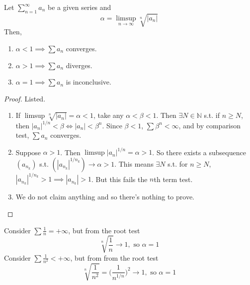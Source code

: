   \begin{theorem}
    Let $\sum_{n=1}^\infty a_n$ be a given series and 
    \begin{equation}
      \alpha = \limsup_{n\rightarrow \infty} \sqrt[n]{|a_n|}
    \end{equation}
    Then, 
    \begin{enumerate}
      \item $\alpha < 1 \implies \sum a_n$ converges. 
      \item $\alpha > 1 \implies \sum a_n$ diverges. 
      \item $\alpha = 1 \implies \sum a_n$ is inconclusive. 
    \end{enumerate}
  \end{theorem} 
  \begin{proof}
    Listed. 
    \begin{enumerate}
      \item If $\limsup \sqrt[n]{|a_n|} = \alpha < 1$, take any $\alpha < \beta < 1$. Then $\exists N \in \mathbb{N}$ s.t. if $n \geq N$, then $|a_n|^{1/n} < \beta \iff |a_n| < \beta^n$. Since $\beta < 1$, $\sum \beta^n < \infty$, and by comparison test, $\sum a_n$ converges. 

      \item Suppose $\alpha > 1$. Then $\limsup |a_n|^{1/n} = \alpha > 1$. So there exists a subsequence $(a_{n_k})$ s.t. $(|a_{n_k}|^{1/n_k}) \rightarrow \alpha > 1$. This means $\exists N$ s.t. for $n \geq N$, $|a_{n_k}|^{1/{n_k}} > 1 \implies |a_{n_k}| > 1$. But this fails the $n$th term test. 

      \item We do not claim anything and so there's nothing to prove. 
    \end{enumerate}
  \end{proof}

  \begin{example}
    Consider $\sum \frac{1}{n} = +\infty$, but from the root test 
    \begin{equation}
      \sqrt[n]{\frac{1}{n}} \rightarrow 1, \text{ so } \alpha = 1
    \end{equation}
    Consider $\sum \frac{1}{n^2} < +\infty$, but from from the root test 
    \begin{equation}
      \sqrt[n]{\frac{1}{n^2}} = \bigg( \frac{1}{n^{1/n}} \bigg)^2 \rightarrow 1, \text{ so } \alpha = 1
    \end{equation}
  \end{example}

